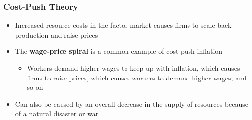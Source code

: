 \documentclass[
  letterpaper,
  DIV=11,
  numbers=noendperiod]{scrartcl}
\providecommand{\tightlist}{%
  \setlength{\itemsep}{0pt}\setlength{\parskip}{0pt}}\usepackage{longtable,booktabs,array}
\begin{document}
\subsubsection{Cost-Push Theory}\label{cost-push-theory}

\begin{itemize}
\tightlist
\item
  Increased resource costs in the factor market causes firms to scale
  back production and raise prices
\item
  The \textbf{wage-price spiral} is a common example of cost-push
  inflation

  \begin{itemize}
  \tightlist
  \item
    Workers demand higher wages to keep up with inflation, which causes
    firms to raise prices, which causes workers to demand higher wages,
    and so on
  \end{itemize}
\item
  Can also be caused by an overall decrease in the supply of resources
  because of a natural disaster or war
\end{itemize}

\newpage{}
\end{document}
